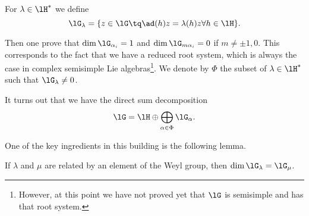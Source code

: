 For \( \lambda\in\lH^*\) we define
\begin{equation}
	\lG_{\lambda}=\{ z\in\lG\tq\ad(h)z=\lambda(h)z\forall h\in\lH \}.
\end{equation}

Then one prove that \( \dim\lG_{\alpha_i}=1\) and \( \dim\lG_{m\alpha_i}=0\) if \( m\neq \pm 1,0\). This corresponds to the fact that we have a reduced root system, which is always the case in complex semisimple Lie algebras\footnote{However, at this point we have not proved yet that \( \lG\) is semisimple and has that root system.}. We denote by \( \Phi\) the subset of \( \lambda\in\lH^*\) such that \( \lG_{\lambda}\neq 0\).

It turns out that we have the direct sum decomposition
\begin{equation}
	\lG=\lH\oplus\bigoplus_{\alpha\in\Phi}\lG_{\alpha}.
\end{equation}

One of the key ingredients in this building is the following lemma.
\begin{lemma}
	If \( \lambda\) and \( \mu\) are related by an element of the Weyl group, then \( \dim\lG_{\lambda}=\lG_{\mu}\).
\end{lemma}



